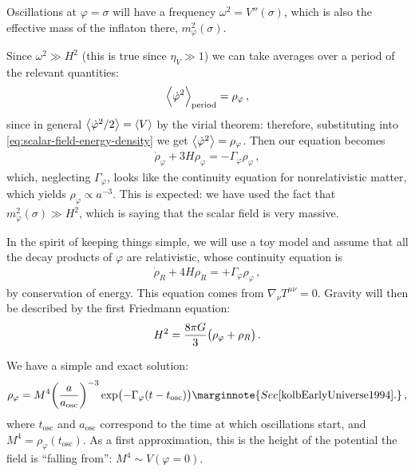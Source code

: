 \documentclass[main.tex]{subfiles}
\begin{document}
Oscillations at \(\varphi = \sigma \) will have a frequency \(\omega^2 = V''(\sigma )\), which is also the effective mass of the inflaton there, \(m^2_\varphi (\sigma )\). 

Since \(\omega^2 \gg H^2\) (this is true since \(\eta _V \gg 1\)) we can take averages over a period of the relevant quantities: 
%
\begin{align}
\expval{\dot{\varphi}^2} _{\text{period}} = \rho _\varphi 
\,,
\end{align}
%
since in general \(\expval{\dot{\varphi}^2 / 2} = \expval{V}\) by the virial theorem: therefore, substituting into \eqref{eq:scalar-field-energy-density} we get \(\expval{\dot{\varphi}^2} = \rho _\varphi \). 
Then our equation becomes 
%
\begin{align}
\dot{\rho}_\varphi + 3 H \rho _\varphi =  - \Gamma _\varphi \rho _\varphi 
\,,
\end{align}
%
which, neglecting \(\Gamma _\varphi \), looks like the continuity equation for nonrelativistic matter, which yields \(\rho _\varphi \propto a^{-3}\). 
This is expected: we have used the fact that \(m^2_\varphi (\sigma ) \gg H^2\), which is saying that the scalar field is very massive. 

In the spirit of keeping things simple, we will use a toy model and assume that all the decay products of \(\varphi \) are relativistic, whose continuity equation is 
%
\begin{align}
\dot{\rho} _R + 4 H \rho _R = + \Gamma _\varphi  \rho _\varphi 
\,,
\end{align}
%
by conservation of energy. This equation comes from \(\nabla_\nu T^{\mu \nu } = 0\). 
Gravity will then be described by the first Friedmann equation: 
%
\begin{align}
H^2 = \frac{8 \pi G}{3} \qty(\rho _\varphi + \rho _R)
\,.
\end{align}

We have a simple and exact solution: 
%
\begin{align}
\rho _\varphi = M^{4} \qty(\frac{a}{a _{\text{osc}}})^{-3} \exp(- \Gamma _\varphi \qty(t - t _{\text{osc}}))
\marginnote{See \cite[eq. 8.30]{kolbEarlyUniverse1994}.}
\,,
\end{align}
%
where \(t _{\text{osc}}\) and \(a _{\text{osc}}\) correspond to the time at which oscillations start, and \(M^{4} = \rho _\varphi ( t _{\text{osc}})\).
As a first approximation, this is the height of the potential the field is ``falling from'': \(M^{4} \sim V(\varphi = 0)\). 
\end{document}
